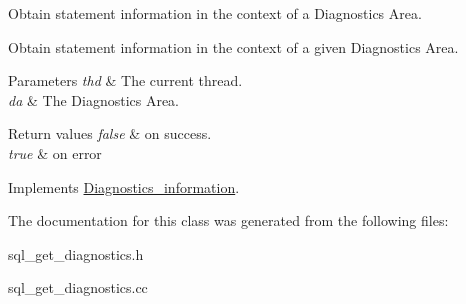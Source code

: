 Obtain statement information in the context of a Diagnostics Area.

Obtain statement information in the context of a given Diagnostics Area.


\begin{DoxyParams}{Parameters}
{\em thd} & The current thread. \\
\hline
{\em da} & The Diagnostics Area.\\
\hline
\end{DoxyParams}

\begin{DoxyRetVals}{Return values}
{\em false} & on success. \\
\hline
{\em true} & on error \\
\hline
\end{DoxyRetVals}


Implements \mbox{\hyperlink{classDiagnostics__information_a5181f11d3ef8554e1989a882bc2504dc}{Diagnostics\+\_\+information}}.



The documentation for this class was generated from the following files\+:\begin{DoxyCompactItemize}
\item 
sql\+\_\+get\+\_\+diagnostics.\+h\item 
sql\+\_\+get\+\_\+diagnostics.\+cc\end{DoxyCompactItemize}
